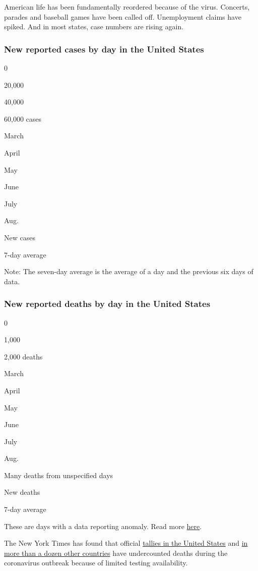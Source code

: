 American life has been fundamentally reordered because of the virus.
Concerts, parades and baseball games have been called off. Unemployment
claims have spiked. And in most states, case numbers are rising again.

\hypertarget{new-reported-cases-by-day-in-the-united-states}{%
\subsubsection{New reported cases by day in the United
States}\label{new-reported-cases-by-day-in-the-united-states}}

0

20,000

40,000

60,000 cases

March

April

May

June

July

Aug.

New cases

7-day average

Note: The seven-day average is the average of a day and the previous six
days of data.

\hypertarget{new-reported-deaths-by-day-in-the-united-states}{%
\subsubsection{New reported deaths by day in the United
States}\label{new-reported-deaths-by-day-in-the-united-states}}

0

1,000

2,000 deaths

March

April

May

June

July

Aug.

Many deaths from unspecified days

New deaths

7-day average

These are days with a data reporting anomaly. Read more
\protect\hyperlink{anomaly-notes}{here}.

The New York Times has found that official
\href{https://www.nytimes3xbfgragh.onion/interactive/2020/04/28/us/coronavirus-death-toll-total.html}{tallies
in the United States} and
\href{https://www.nytimes3xbfgragh.onion/interactive/2020/04/21/world/coronavirus-missing-deaths.html}{in
more than a dozen other countries} have undercounted deaths during the
coronavirus outbreak because of limited testing availability.

